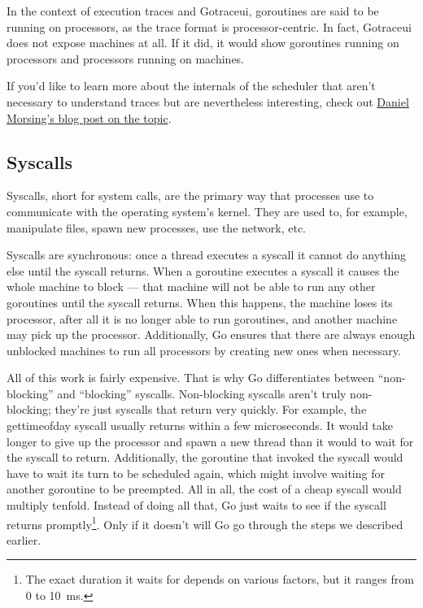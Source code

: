 \documentclass[10pt,letterpaper,oneside,openany,english]{memoir}
\newcommand{\code}[1]{{\ttfamily\mbox{#1}}}
\begin{document}
In the context of execution traces and Gotraceui, goroutines are said to be running on processors, as the trace format is processor-centric.
In fact, Gotraceui does not expose machines at all.
If it did, it would show goroutines running on processors and processors running on machines.

If you'd like to learn more about the internals of the scheduler that aren't necessary to understand traces but are nevertheless interesting, check out \href{https://morsmachine.dk/go-scheduler}{Daniel Morsing's blog post on the topic}.\cite{morsingGoScheduler2013}

\subsection{Syscalls}\label{syscalls}
Syscalls, short for system calls, are the primary way that processes use to communicate with the operating system's kernel.
They are used to, for example, manipulate files, spawn new processes, use the network, etc.

Syscalls are synchronous: once a thread executes a syscall it cannot do anything else until the syscall returns.
When a goroutine executes a syscall it causes the whole machine to block --- that machine will not be able to run any other goroutines until the syscall returns.
When this happens, the machine loses its processor, after all it is no longer able to run goroutines, and another machine may pick up the processor.
Additionally, Go ensures that there are always enough unblocked machines to run all processors by creating new ones when necessary.

All of this work is fairly expensive.
That is why Go differentiates between ``non-blocking'' and ``blocking'' syscalls.
Non-blocking syscalls aren't truly non-blocking; they're just syscalls that return very quickly.
For example, the \code{gettimeofday} syscall usually returns within a few microseconds.
It would take longer to give up the processor and spawn a new thread than it would to wait for the syscall to return.
Additionally, the goroutine that invoked the syscall would have to wait its turn to be scheduled again, which might involve waiting for another goroutine to be preempted.
All in all, the cost of a cheap syscall would multiply tenfold.
Instead of doing all that, Go just waits to see if the syscall returns promptly\footnote{The exact duration it waits for depends on various factors, but it ranges from \num{0} to \qty{10}{\milli\second}.}.
Only if it doesn't will Go go through the steps we described earlier.
\end{document}
